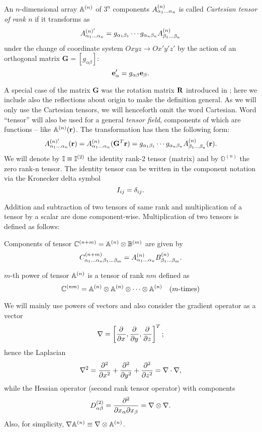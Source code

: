 \begin{definition}\label{def:tensor}
  An $n$-dimensional array $\AA$ of $3^n$ components $\AAA{\alpha_1\ldots\alpha_n}$ is called \textit{Cartesian tensor 
  of rank $n$} if it transforms as
  \begin{equation}\label{eq:tenstran}
    A^{(n)'}_{\alpha_1\ldots\alpha_n} = g_{\alpha_1\beta_1}\cdots g_{\alpha_n\beta_n}\AAA{\beta_1\ldots\beta_n}
  \end{equation}
  under the change of coordinate system $Oxyz \to Ox'y'z'$ by the action of an orthogonal matrix $\mathbf{G} = [g_{\alpha\beta}]$:
  $$
    \be_\alpha' = g_{\alpha\beta}\be_\beta.
  $$
\end{definition}
A special case of the matrix $\mathbf{G}$ was the rotation matrix $\mat{R}$ introduced in ; here we
include also the reflections about origin to make the definition general. As we will only use the Cartesian tensors, we
will henceforth omit the word Cartesian. Word ``tensor'' will also be used for a general \textit{tensor field},
components of which are functions -- like $\AA(\br)$. The transformation has then the following form:
$$
  A^{(n)'}_{\alpha_1\ldots\alpha_n}(\br) = \AAA{\alpha_1\ldots\alpha_n}(\mathbf{G}^{T}\br) = g_{\alpha_1\beta_1}\cdots g_{\alpha_n\beta_n}\AAA{\beta_1\ldots\beta_n}(\br).
$$
We will denote by $\eye \equiv \eye^{(2)}$ the identity rank-2 tensor (matrix) and by $ \mathbb{O}^{(n)}$ the zero
rank-n tensor. The identity tensor can be written in the component notation via the Kronecker delta symbol
$$
	I_{ij} = \kron{i}{j}.
$$

Addition and subtraction of two tensors of same rank and multiplication of a tensor by a scalar are done component-wise. 
Multiplication of two tensors is defined as follows:
\begin{definition}
  Components of tensor $\CC[n+m] = \AA\otimes\BB[m]$ are given by
  $$
    \CCC[n+m]{\alpha_1\ldots\alpha_n\beta_1\ldots\beta_m} = \AAA{\alpha_1\ldots\alpha_n}\BBB{\beta_1\ldots\beta_m}.
  $$
\end{definition}

\begin{definition}
  $m$-th power of tensor $\AA$ is a tensor of rank $nm$ defined as
  $$
    \CC[nm] = \AA\otimes\AA\otimes\cdots\otimes\AA\quad \mbox{($m$-times)}
  $$
\end{definition}
We will mainly use powers of vectors and also consider the gradient operator as a vector
$$
  \nabla = \left[\pd{}{x}, \pd{}{y}, \pd{}{z}\right]^T;
$$
hence the Laplacian 
$$
	\lap = \pd[2]{}{x} + \pd[2]{}{y} + \pd[2]{}{z} = \nabla \cdot \nabla,
$$
while the Hessian operator (second rank tensor operator) with components
$$
	D^{(2)}_{\alpha\beta} = \pdd[2]{}{\partial x_\alpha \partial x_\beta} = \nabla \otimes \nabla.
$$
Also, for simplicity,
	$\nabla\AA \equiv \nabla\otimes\AA$.


